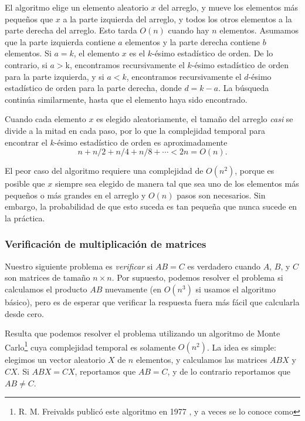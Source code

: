 El algoritmo elige un elemento aleatorio $x$ del arreglo, y mueve los
elementos más pequeños que $x$ a la parte izquierda del arreglo, y todos
los otros elementos a la parte derecha del arreglo. Esto tarda $O(n)$
cuando hay $n$ elementos. Asumamos que la parte izquierda contiene $a$
elementos y la parte derecha contiene $b$ elementos. Si $a=k$, el
elemento $x$ es el $k$-ésimo estadístico de orden. De lo contrario, si $a>$k,
encontramos recursivamente el $k$-ésimo estadístico de orden para la
parte izquierda, y si $a<k$, encontramos recursivamente el $d$-ésimo
estadístico de orden para la parte derecha, donde $d=k-a$. La búsqueda
continúa similarmente, hasta que el elemento haya sido encontrado.

Cuando cada elemento $x$ es elegido aleatoriamente, el tamaño del arreglo
\emph{casi} se divide a la mitad en cada paso, por lo que la complejidad
temporal para encontrar el $k$-ésimo estadístico de orden es aproximadamente
\[n+n/2+n/4+n/8+\cdots < 2n = O(n).\]

El peor caso del algoritmo requiere una complejidad de $O(n^2)$, porque
es posible que $x$ siempre sea elegido de manera tal que sea uno de los
elementos más pequeños o más grandes en el arreglo y $O(n)$ pasos son
necesarios. Sin embargo, la probabilidad de que esto suceda es tan pequeña
que nunca sucede en la práctica.

\subsubsection{Verificación de multiplicación de matrices}


Nuestro siguiente problema es \emph{verificar} si $AB=C$ es verdadero
cuando $A$, $B$, y $C$ son matrices de tamaño $n \times n$. Por supuesto,
podemos resolver el problema si calculamos el producto $AB$ nuevamente
(en $O(n^3)$ si usamos el algoritmo básico), pero es de esperar que verificar
la respuesta fuera más fácil que calcularla desde cero.


Resulta que podemos resolver el problema utilizando un algoritmo de
Monte Carlo\footnote{R. M. Freivalds publicó este algoritmo en 1977
    \cite{fre77}, y a veces se lo conoce como }
cuya complejidad temporal es solamente $O(n^2)$. La idea es simple:
elegimos un vector aleatorio $X$ de $n$ elementos, y calculamos las
matrices $ABX$ y $CX$. Si $ABX=CX$, reportamos que $AB=C$, y de lo
contrario reportamos que $AB \neq C$.


